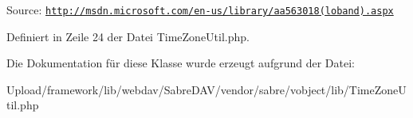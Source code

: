 Source\+: \href{http://msdn.microsoft.com/en-us/library/aa563018(loband).aspx}{\tt http\+://msdn.\+microsoft.\+com/en-\/us/library/aa563018(loband).\+aspx} 

Definiert in Zeile 24 der Datei Time\+Zone\+Util.\+php.



Die Dokumentation für diese Klasse wurde erzeugt aufgrund der Datei\+:\begin{DoxyCompactItemize}
\item 
Upload/framework/lib/webdav/\+Sabre\+D\+A\+V/vendor/sabre/vobject/lib/Time\+Zone\+Util.\+php\end{DoxyCompactItemize}

